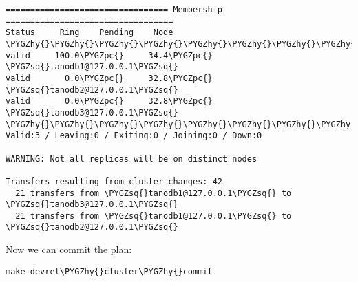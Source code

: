 \documentclass[letterpaper,10pt,english]{sphinxmanual}
\def\PYGZpc{\char`\%}
\def\PYGZhy{\char`\-}
\def\PYGZsq{\char`\'}
\renewcommand\PYGZsq{\textquotesingle}
\begin{document}
\begin{Verbatim}[commandchars=\\\{\}]
================================= Membership ==================================
Status     Ring    Pending    Node
\PYGZhy{}\PYGZhy{}\PYGZhy{}\PYGZhy{}\PYGZhy{}\PYGZhy{}\PYGZhy{}\PYGZhy{}\PYGZhy{}\PYGZhy{}\PYGZhy{}\PYGZhy{}\PYGZhy{}\PYGZhy{}\PYGZhy{}\PYGZhy{}\PYGZhy{}\PYGZhy{}\PYGZhy{}\PYGZhy{}\PYGZhy{}\PYGZhy{}\PYGZhy{}\PYGZhy{}\PYGZhy{}\PYGZhy{}\PYGZhy{}\PYGZhy{}\PYGZhy{}\PYGZhy{}\PYGZhy{}\PYGZhy{}\PYGZhy{}\PYGZhy{}\PYGZhy{}\PYGZhy{}\PYGZhy{}\PYGZhy{}\PYGZhy{}\PYGZhy{}\PYGZhy{}\PYGZhy{}\PYGZhy{}\PYGZhy{}\PYGZhy{}\PYGZhy{}\PYGZhy{}\PYGZhy{}\PYGZhy{}\PYGZhy{}\PYGZhy{}\PYGZhy{}\PYGZhy{}\PYGZhy{}\PYGZhy{}\PYGZhy{}\PYGZhy{}\PYGZhy{}\PYGZhy{}\PYGZhy{}\PYGZhy{}\PYGZhy{}\PYGZhy{}\PYGZhy{}\PYGZhy{}\PYGZhy{}\PYGZhy{}\PYGZhy{}\PYGZhy{}\PYGZhy{}\PYGZhy{}\PYGZhy{}\PYGZhy{}\PYGZhy{}\PYGZhy{}\PYGZhy{}\PYGZhy{}\PYGZhy{}\PYGZhy{}
valid     100.0\PYGZpc{}     34.4\PYGZpc{}    \PYGZsq{}tanodb1@127.0.0.1\PYGZsq{}
valid       0.0\PYGZpc{}     32.8\PYGZpc{}    \PYGZsq{}tanodb2@127.0.0.1\PYGZsq{}
valid       0.0\PYGZpc{}     32.8\PYGZpc{}    \PYGZsq{}tanodb3@127.0.0.1\PYGZsq{}
\PYGZhy{}\PYGZhy{}\PYGZhy{}\PYGZhy{}\PYGZhy{}\PYGZhy{}\PYGZhy{}\PYGZhy{}\PYGZhy{}\PYGZhy{}\PYGZhy{}\PYGZhy{}\PYGZhy{}\PYGZhy{}\PYGZhy{}\PYGZhy{}\PYGZhy{}\PYGZhy{}\PYGZhy{}\PYGZhy{}\PYGZhy{}\PYGZhy{}\PYGZhy{}\PYGZhy{}\PYGZhy{}\PYGZhy{}\PYGZhy{}\PYGZhy{}\PYGZhy{}\PYGZhy{}\PYGZhy{}\PYGZhy{}\PYGZhy{}\PYGZhy{}\PYGZhy{}\PYGZhy{}\PYGZhy{}\PYGZhy{}\PYGZhy{}\PYGZhy{}\PYGZhy{}\PYGZhy{}\PYGZhy{}\PYGZhy{}\PYGZhy{}\PYGZhy{}\PYGZhy{}\PYGZhy{}\PYGZhy{}\PYGZhy{}\PYGZhy{}\PYGZhy{}\PYGZhy{}\PYGZhy{}\PYGZhy{}\PYGZhy{}\PYGZhy{}\PYGZhy{}\PYGZhy{}\PYGZhy{}\PYGZhy{}\PYGZhy{}\PYGZhy{}\PYGZhy{}\PYGZhy{}\PYGZhy{}\PYGZhy{}\PYGZhy{}\PYGZhy{}\PYGZhy{}\PYGZhy{}\PYGZhy{}\PYGZhy{}\PYGZhy{}\PYGZhy{}\PYGZhy{}\PYGZhy{}\PYGZhy{}\PYGZhy{}
Valid:3 / Leaving:0 / Exiting:0 / Joining:0 / Down:0

WARNING: Not all replicas will be on distinct nodes

Transfers resulting from cluster changes: 42
  21 transfers from \PYGZsq{}tanodb1@127.0.0.1\PYGZsq{} to \PYGZsq{}tanodb3@127.0.0.1\PYGZsq{}
  21 transfers from \PYGZsq{}tanodb1@127.0.0.1\PYGZsq{} to \PYGZsq{}tanodb2@127.0.0.1\PYGZsq{}
\end{Verbatim}

Now we can commit the plan:

\begin{Verbatim}[commandchars=\\\{\}]
make devrel\PYGZhy{}cluster\PYGZhy{}commit
\end{Verbatim}
\end{document}
